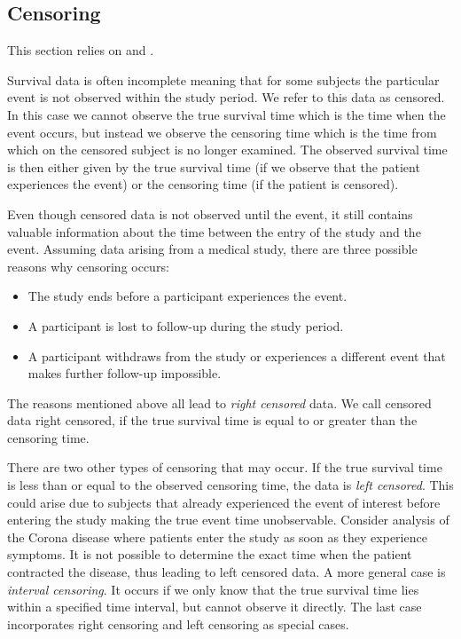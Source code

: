 \documentclass[12pt, a4paper]{scrartcl}
\theoremstyle{definition}
\theoremstyle{plain}
\numberwithin{equation}{section}
\numberwithin{figure}{section}
\numberwithin{table}{section}
\begin{document}
	\subsection{Censoring} \label{censoring}
	
	This section relies on \citet*{sabook} and \citet*{mathsabook}.
	
	Survival data is often incomplete meaning that for some subjects the particular event is not observed within the study period.
	We refer to this data as censored.
	In this case we cannot observe the true survival time which is the time when the event occurs, but instead we observe the censoring time which is the time from which on the censored subject is no longer examined.
	The observed survival time is then either given by the true survival time (if we observe that the patient experiences the event) or the censoring time (if the patient is censored).
	
	Even though censored data is not observed until the event, it still contains valuable information about the time between the entry of the study and the event.
	Assuming data arising from a medical study, there are three possible reasons why censoring occurs:
	\begin{itemize}
		\item The study ends before a participant experiences the event.
		\item A participant is lost to follow-up during the study period. %
		\item A participant withdraws from the study or experiences a different event that makes further follow-up impossible.
	\end{itemize}

	The reasons mentioned above all lead to \emph{right censored} data.
	We call censored data right censored, if the true survival time is equal to or greater than the censoring time.
	
	There are two other types of censoring that may occur.
	If the true survival time is less than or equal to the observed censoring time, the data is \emph{left censored}.
	This could arise due to subjects that already experienced the event of interest before entering the study making the true event time unobservable.
	Consider analysis of the Corona disease where patients enter the study as soon as they experience symptoms.
	It is not possible to determine the exact time when the patient contracted the disease, thus leading to left censored data.
	A more general case is \emph{interval censoring}.
	It occurs if we only know that the true survival time lies within a specified time interval, but cannot observe it directly.
	The last case incorporates right censoring and left censoring as special cases.
	
\end{document}
